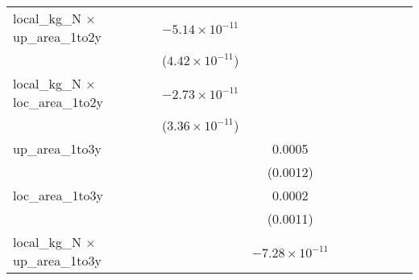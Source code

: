 \begin{tabular}{lcccccccc}
   local\_kg\_N $\times$ up\_area\_1to2y       & $-5.14\times 10^{-11}$        &                               &                               &                               &                               &                               &                               &   \\   
                                               & ($4.42\times 10^{-11}$)       &                               &                               &                               &                               &                               &                               &   \\   
   local\_kg\_N $\times$ loc\_area\_1to2y      & $-2.73\times 10^{-11}$        &                               &                               &                               &                               &                               &                               &   \\   
                                               & ($3.36\times 10^{-11}$)       &                               &                               &                               &                               &                               &                               &   \\   
   up\_area\_1to3y                             &                               & 0.0005                        &                               &                               &                               &                               &                               &   \\   
                                               &                               & (0.0012)                      &                               &                               &                               &                               &                               &   \\   
   loc\_area\_1to3y                            &                               & 0.0002                        &                               &                               &                               &                               &                               &   \\   
                                               &                               & (0.0011)                      &                               &                               &                               &                               &                               &   \\   
   local\_kg\_N $\times$ up\_area\_1to3y       &                               & $-7.28\times 10^{-11}$        &                               &                               &                               &                               &                               &   \\   

\end{tabular}
